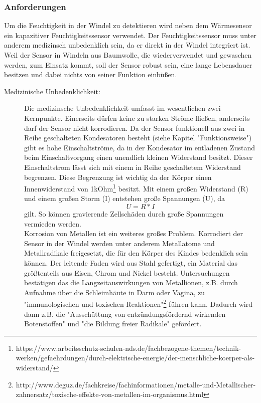 \subsubsection{Anforderungen}
\label{sec:cap_requirements}
Um die Feuchtigkeit in der Windel zu detektieren wird neben dem Wärmesensor ein kapazitiver Feuchtigkeitssensor verwendet. Der Feuchtigkeitssensor muss unter anderem medizinsch unbedenklich sein, da er direkt in der Windel integriert ist. Weil der Sensor in Windeln aus Baumwolle, die wiederverwendet und gewaschen werden, zum Einsatz kommt, soll der Sensor robust sein, eine lange Lebensdauer besitzen und dabei nichts von seiner Funktion einbüßen.

\begin{description}
\item[Medizinische Unbedenklichkeit:]
Die medizinsche Unbedenklichkeit umfasst im wesentlichen zwei Kernpunkte. Einerseits dürfen keine zu starken Ströme fließen, anderseits darf der Sensor nicht korrodieren. Da der Sensor funktionell aus zwei in Reihe geschalteten Kondesatoren besteht (siehe Kapitel "Funktionsweise") gibt es hohe Einschaltströme, da in der Kondesator im entladenen Zustand beim Einschaltvorgang einen unendlich kleinen Widerstand besitzt. Dieser Einschaltstrom lässt sich mit einem in Reihe geschaltetem Widerstand begrenzen. Diese Begrenzung ist wichtig da der Körper einen Innenwiderstand von 1kOhm\footnote{https://www.arbeitsschutz-schulen-nds.de/fachbezogene-themen/technik-werken/gefaehrdungen/durch-elektrische-energie/der-menschliche-koerper-als-widerstand/} besitzt. Mit einem großen Widerstand (R) und einem großen Storm (I) entstehen große Spannungen (U), da
\[U = R * I\]  gilt. So können gravierende Zellschäden durch große Spannungen vermieden werden. \\
Korrosion von Metallen ist ein weiteres großes Problem. Korrodiert der Sensor in der Windel werden unter anderem Metallatome und Metallradikale freigesetzt, die für den Körper des Kindes bedenklich sein können. Der leitende Faden wird aus Stahl gefertigt, ein Material das größtenteils aus Eisen, Chrom und Nickel besteht. Untersuchungen bestätigen das die Langzeitauswirkungen von Metallionen, z.B. durch Aufnahme über die Schleimhäute in Darm oder Vagina, zu "immunologischen und toxischen Reaktionen"\footnote{http://www.deguz.de/fachkreise/fachinformationen/metalle-und-Metallischer-zahnersatz/toxische-effekte-von-metallen-im-organismus.html} führen kann. Dadurch wird dann z.B. die "Ausschüttung von entzündungsfördernd wirkenden Botenstoffen" und "die Bildung freier Radikale" gefördert.
	

\end{description}

